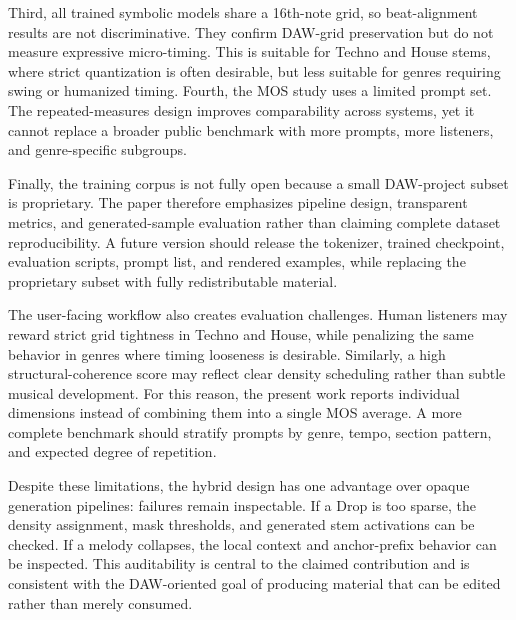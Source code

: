 \documentclass[conference]{conference-latex-template_10-17-19/IEEEtran}
\begin{document}
Third, all trained symbolic models share a 16th-note grid, so beat-alignment results are not discriminative. They confirm DAW-grid preservation but do not measure expressive micro-timing. This is suitable for Techno and House stems, where strict quantization is often desirable, but less suitable for genres requiring swing or humanized timing. Fourth, the MOS study uses a limited prompt set. The repeated-measures design improves comparability across systems, yet it cannot replace a broader public benchmark with more prompts, more listeners, and genre-specific subgroups.

Finally, the training corpus is not fully open because a small DAW-project subset is proprietary. The paper therefore emphasizes pipeline design, transparent metrics, and generated-sample evaluation rather than claiming complete dataset reproducibility. A future version should release the tokenizer, trained checkpoint, evaluation scripts, prompt list, and rendered examples, while replacing the proprietary subset with fully redistributable material.

The user-facing workflow also creates evaluation challenges. Human listeners may reward strict grid tightness in Techno and House, while penalizing the same behavior in genres where timing looseness is desirable. Similarly, a high structural-coherence score may reflect clear density scheduling rather than subtle musical development. For this reason, the present work reports individual dimensions instead of combining them into a single MOS average. A more complete benchmark should stratify prompts by genre, tempo, section pattern, and expected degree of repetition.

Despite these limitations, the hybrid design has one advantage over opaque generation pipelines: failures remain inspectable. If a Drop is too sparse, the density assignment, mask thresholds, and generated stem activations can be checked. If a melody collapses, the local context and anchor-prefix behavior can be inspected. This auditability is central to the claimed contribution and is consistent with the DAW-oriented goal of producing material that can be edited rather than merely consumed.
\end{document}
